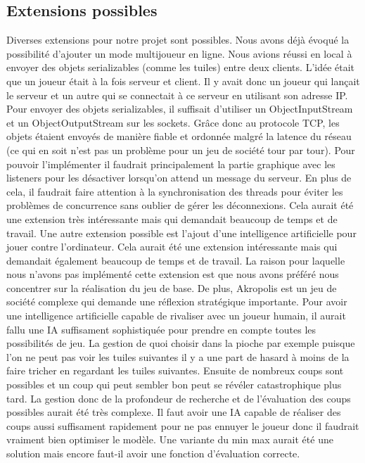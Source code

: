 \documentclass{article}
\begin{document}
    \subsection{Extensions possibles}\label{subsec:extensions}

    Diverses extensions pour notre projet sont possibles. Nous avons déjà évoqué la possibilité d'ajouter un mode multijoueur en ligne.
    Nous avions réussi en local à envoyer des objets serializables (comme les tuiles) entre deux clients. L'idée était que un joueur était à la fois serveur et client.
    Il y avait donc un joueur qui lançait le serveur et un autre qui se connectait à ce serveur en utilisant son adresse IP.
    Pour envoyer des objets serializables, il suffisait d'utiliser un ObjectInputStream et un ObjectOutputStream sur les sockets.
    Grâce donc au protocole TCP, les objets étaient envoyés de manière fiable et ordonnée malgré la latence du réseau (ce qui en soit n'est pas un problème pour un jeu de société tour par tour).
    Pour pouvoir l'implémenter il faudrait principalement la partie graphique avec les listeners pour les désactiver lorsqu'on attend un message du serveur.
    En plus de cela, il faudrait faire attention à la synchronisation des threads pour éviter les problèmes de concurrence sans oublier de gérer les déconnexions.
    Cela aurait été une extension très intéressante mais qui demandait beaucoup de temps et de travail.
    \newline
    Une autre extension possible est l'ajout d'une intelligence artificielle pour jouer contre l'ordinateur.
    Cela aurait été une extension intéressante mais qui demandait également beaucoup de temps et de travail.
    La raison pour laquelle nous n'avons pas implémenté cette extension est que nous avons préféré nous concentrer sur la réalisation du jeu de base.
    De plus, Akropolis est un jeu de société complexe qui demande une réflexion stratégique importante.
    Pour avoir une intelligence artificielle capable de rivaliser avec un joueur humain, il aurait fallu une IA suffisament sophistiquée pour prendre en compte toutes les possibilités de jeu.
    La gestion de quoi choisir dans la pioche par exemple puisque l'on ne peut pas voir les tuiles suivantes il y a une part de hasard à moins de la faire tricher en regardant les tuiles suivantes.
    Ensuite de nombreux coups sont possibles et un coup qui peut sembler bon peut se révéler catastrophique plus tard.
    La gestion donc de la profondeur de recherche et de l'évaluation des coups possibles aurait été très complexe.
    Il faut avoir une IA capable de réaliser des coups aussi suffisament rapidement pour ne pas ennuyer le joueur donc il faudrait vraiment bien optimiser le modèle.
    Une variante du min max aurait été une solution mais encore faut-il avoir une fonction d'évaluation correcte.
\end{document}
